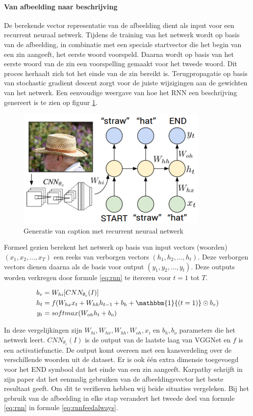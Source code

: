 \paragraph{Van afbeelding naar beschrijving}
De berekende vector representatie van de afbeelding dient als input voor een recurrent neuraal netwerk. Tijdens de training van het netwerk wordt op basis van de afbeelding, in combinatie met een speciale startvector die het begin van een zin aangeeft, het eerste woord voorspeld. Daarna wordt op basis van het eerste woord van de zin een voorspelling gemaakt voor het tweede woord. Dit proces herhaalt zich tot het einde van de zin bereikt is. Terugpropagatie op basis van stochastic gradient descent zorgt voor de juiste wijzigingen aan de gewichten van het netwerk. Een eenvoudige weergave van hoe het RNN een beschrijving genereert is te zien op figuur \ref{fig:rnntraining}.

\begin{figure}[tb]
    \centering
    \includegraphics[width=0.5\linewidth]{Images/karpathy.PNG}
    \caption{Generatie van caption met recurrent neuraal netwerk}
\label{fig:rnntraining}
\end{figure}

Formeel gezien berekent het netwerk op basis van input vectors (woorden) $(x_1,x_2,...,x_T)$ een reeks van verborgen vectors $(h_1,h_2,...,h_t)$. Deze verborgen vectors dienen daarna als de basis voor output $(y_1,y_2,...,y_t)$. Deze outputs worden verkregen door formule \eqref{eq:rnn} te itereren voor $t = 1$ tot $T$.

\begin{equation}
\begin{aligned}
     b_v &= W_{hi} [CNN_{\theta_c}(I)] \\
     h_t &= f(W_{hx} x_{t} + W_{hh} h_{t-1} + b_h + \mathbbm{1}{(t=1)} \odot b_v) \\
     y_t &= softmax( W_{oh} h_t + b_o)
\end{aligned}
\label{eq:rnn}
\end{equation}

In deze vergelijkingen zijn $W_{hi}, W_{hx}, W_{hh}, W_{oh}, x_i$ en $b_h, b_o$ parameters die het netwerk leert. $CNN_{\theta_c}(I)$ is de output van de laatste laag van VGGNet en $f$ is een activatiefunctie. De output komt overeen met een kansverdeling over de verschillende woorden uit de dataset. Er is ook \'e\'en extra dimensie toegevoegd voor het END symbool dat het einde van een zin aangeeft. Karpathy schrijft in zijn paper dat het eenmalig gebruiken van de afbeeldingsvector het beste resultaat geeft. Om dit te verifieren hebben wij beide situaties vergeleken. Bij het gebruik van de afbeelding in elke stap verandert het tweede deel van formule \eqref{eq:rnn} in formule \eqref{eq:rnnfeedalways}.

